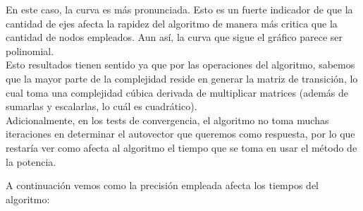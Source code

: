 \begin{center}
\end{center}

En este caso, la curva es más pronunciada. Esto es un fuerte indicador de que la cantidad de ejes afecta la rapidez del algoritmo de manera más critica que la cantidad de nodos empleados. Aun así, la curva que sigue el gráfico parece ser polinomial.\\

Esto resultados tienen sentido ya que por las operaciones del algoritmo, sabemos que la mayor parte de la complejidad reside en generar la matriz de transición, lo cual toma una complejidad cúbica derivada de multiplicar matrices (además de sumarlas y escalarlas, lo cuál es cuadrático). \\
Adicionalmente, en los tests de convergencia, el algoritmo no toma muchas iteraciones en determinar el autovector que queremos como respuesta, por lo que restaría ver como afecta al algoritmo el tiempo que se toma en usar el método de la potencia.

A continuación vemos como la precisión empleada afecta los tiempos del algoritmo:

\begin{center}
\end{center}


